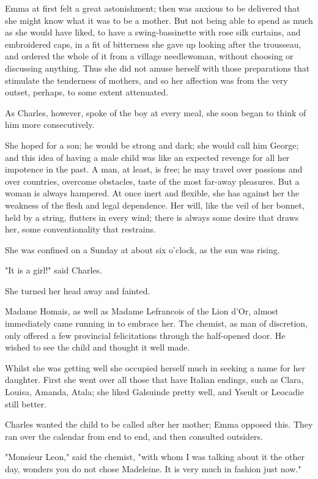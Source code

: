 \documentclass[11pt,twocolumn]{ltugboat}
\begin{document}
Emma at first felt a great astonishment; then was anxious to be
delivered that she might know what it was to be a mother. But not
being able to spend as much as she would have liked, to have a
swing-bassinette with rose silk curtains, and embroidered caps, in a fit
of bitterness she gave up looking after the trousseau, and ordered the
whole of it from a village needlewoman, without choosing or discussing
anything. Thus she did not amuse herself with those preparations that
stimulate the tenderness of mothers, and so her affection was from the
very outset, perhaps, to some extent attenuated.

As Charles, however, spoke of the boy at every meal, she soon began to
think of him more consecutively.

She hoped for a son; he would be strong and dark; she would call him
George; and this idea of having a male child was like an expected
revenge for all her impotence in the past. A man, at least, is free; he
may travel over passions and over countries, overcome obstacles, taste
of the most far-away pleasures. But a woman is always hampered. At once
inert and flexible, she has against her the weakness of the flesh and
legal dependence. Her will, like the veil of her bonnet, held by a
string, flutters in every wind; there is always some desire that draws
her, some conventionality that restrains.

She was confined on a Sunday at about six o'clock, as the sun was
rising.

"It is a girl!" said Charles.

She turned her head away and fainted.

Madame Homais, as well as Madame Lefrancois of the Lion d'Or, almost
immediately came running in to embrace her. The chemist, as man of
discretion, only offered a few provincial felicitations through the
half-opened door. He wished to see the child and thought it well made.

Whilst she was getting well she occupied herself much in seeking a
name for her daughter. First she went over all those that have Italian
endings, such as Clara, Louisa, Amanda, Atala; she liked Galsuinde
pretty well, and Yseult or Leocadie still better.

Charles wanted the child to be called after her mother; Emma opposed
this. They ran over the calendar from end to end, and then consulted
outsiders.

"Monsieur Leon," said the chemist, "with whom I was talking about it
the other day, wonders you do not chose Madeleine. It is very much in
fashion just now."
\end{document}
